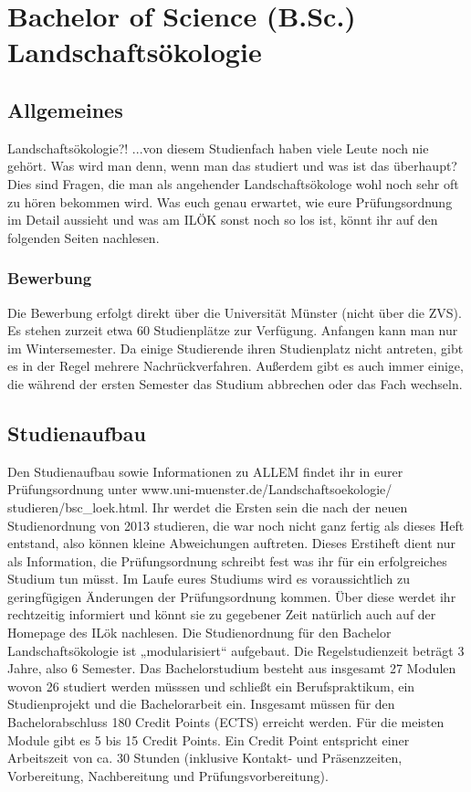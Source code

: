 \chapter{Bachelor of Science (B.Sc.) Landschaftsökologie}

\section{Allgemeines}
Landschaftsökologie?! ...von diesem Studienfach haben viele Leute noch nie gehört. Was wird man denn, wenn man das studiert und was ist das überhaupt? Dies sind Fragen, die man als angehender Landschaftsökologe wohl noch sehr oft zu hören bekommen wird. Was euch genau erwartet, wie eure Prüfungsordnung im Detail aussieht und was am ILÖK sonst noch so los ist, könnt ihr auf den folgenden Seiten nachlesen.

\subsection*{Bewerbung}
Die Bewerbung erfolgt direkt über die Universität Münster (nicht über die ZVS). Es stehen zurzeit etwa 60 Studienplätze zur Verfügung. Anfangen kann man nur im Wintersemester. Da einige Studierende ihren Studienplatz nicht antreten, gibt es in der Regel mehrere Nachrückverfahren. Außerdem gibt es auch immer einige, die während der ersten Semester das Studium abbrechen oder das Fach wechseln.

\section{Studienaufbau}
Den Studienaufbau sowie Informationen zu ALLEM findet ihr in eurer Prüfungsordnung unter www.uni-muenster.de/Landschaftsoekologie/\\studieren/bsc\_loek.html. Ihr werdet die Ersten sein die nach der neuen Studienordnung von 2013 studieren, die war noch nicht ganz fertig als dieses Heft entstand, also können kleine Abweichungen auftreten. Dieses Erstiheft dient nur als Information, die Prüfungsordnung schreibt fest was ihr für ein erfolgreiches Studium tun müsst. Im Laufe eures Studiums wird es voraussichtlich zu geringfügigen Änderungen der Prüfungsordnung kommen. Über diese werdet ihr rechtzeitig informiert und könnt sie zu gegebener Zeit natürlich auch auf der Homepage des ILök nachlesen.
Die Studienordnung für den Bachelor Landschaftsökologie ist „modularisiert“ aufgebaut. Die Regelstudienzeit beträgt 3 Jahre, also 6 Semester. Das Bachelorstudium besteht aus insgesamt 27 Modulen wovon 26 studiert werden müsssen und schließt ein Berufspraktikum, ein Studienprojekt und die Bachelorarbeit ein. Insgesamt müssen für den Bachelorabschluss 180 Credit Points (ECTS) erreicht werden. Für die meisten Module gibt es 5 bis 15 Credit Points. Ein Credit Point entspricht einer Arbeitszeit von ca. 30 Stunden (inklusive Kontakt- und Präsenzzeiten, Vorbereitung, Nachbereitung und Prüfungsvorbereitung). 

